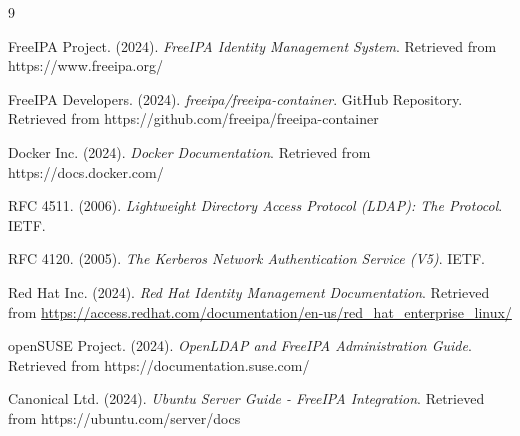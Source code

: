 \documentclass[12pt,a4paper]{report}
\begin{document}
\begin{thebibliography}{9}

FreeIPA Project. (2024). \textit{FreeIPA Identity Management System}. Retrieved from https://www.freeipa.org/

FreeIPA Developers. (2024). \textit{freeipa/freeipa-container}. GitHub Repository. Retrieved from https://github.com/freeipa/freeipa-container

Docker Inc. (2024). \textit{Docker Documentation}. Retrieved from https://docs.docker.com/

RFC 4511. (2006). \textit{Lightweight Directory Access Protocol (LDAP): The Protocol}. IETF.

RFC 4120. (2005). \textit{The Kerberos Network Authentication Service (V5)}. IETF.

Red Hat Inc. (2024). \textit{Red Hat Identity Management Documentation}. Retrieved from \url{https://access.redhat.com/documentation/en-us/red_hat_enterprise_linux/}

openSUSE Project. (2024). \textit{OpenLDAP and FreeIPA Administration Guide}. Retrieved from https://documentation.suse.com/

Canonical Ltd. (2024). \textit{Ubuntu Server Guide - FreeIPA Integration}. Retrieved from https://ubuntu.com/server/docs

\end{thebibliography}
\end{document}

